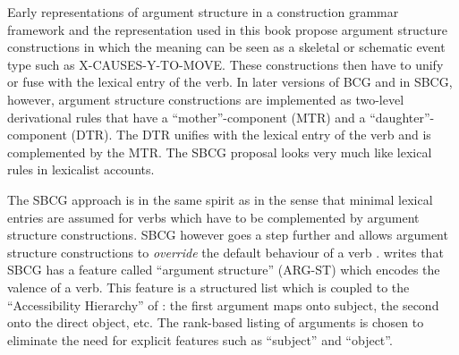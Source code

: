 Early representations of argument structure in a construction grammar framework \citep[such as][]{goldberg95construction} and the representation used in this book propose argument structure constructions in which the meaning can be seen as a skeletal or schematic event type such as X-CAUSES-Y-TO-MOVE. These constructions then have to unify or fuse with the lexical entry of the verb. In later versions of BCG and in SBCG, however, argument structure constructions are implemented as two-level derivational rules that have a ``mother''-component (MTR) and a ``daughter''-component (DTR). The DTR unifies with the lexical entry of the verb and is complemented by the MTR. The SBCG proposal looks very much like lexical rules in lexicalist accounts.

The SBCG approach is in the same spirit as \citet{goldberg95construction} in the sense that minimal lexical entries are assumed for verbs which have to be complemented by argument structure constructions. SBCG however goes a step further and allows argument structure constructions to {\em override} the default behaviour of a verb \citep{michaelis06complementation, sag07sbcg}. \citet{sag07sbcg} writes that SBCG has a feature called ``argument structure'' (ARG-ST) which encodes the valence of a verb. This feature is a structured list which is coupled to the ``Accessibility Hierarchy'' of \citet{keenan77noun}: the first argument maps onto subject, the second onto the direct object, etc. The rank-based listing of arguments is chosen to eliminate the need for explicit features such as ``subject'' and ``object''.

